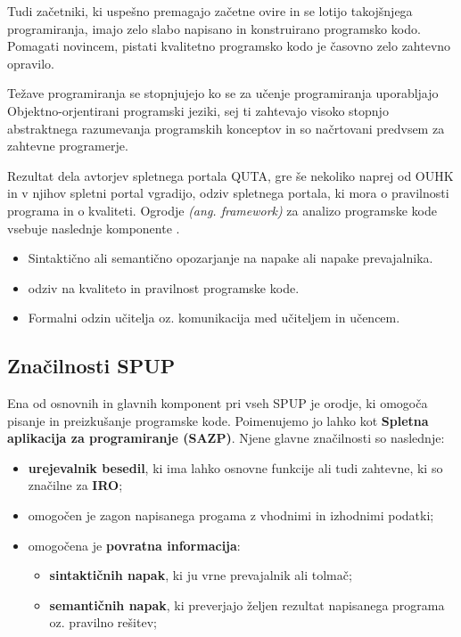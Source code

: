 Tudi začetniki, ki uspešno premagajo začetne ovire in se lotijo
takojšnjega programiranja, imajo zelo slabo napisano in konstruirano
programsko kodo. Pomagati novincem, pistati kvalitetno programsko kodo
je časovno zelo zahtevno opravilo.

Težave programiranja se stopnjujejo ko se za učenje programiranja
uporabljajo Objektno-orjentirani programski jeziki, sej ti zahtevajo
visoko stopnjo abstraktnega razumevanja programskih konceptov in so
načrtovani predvsem za zahtevne programerje.


Rezultat dela avtorjev spletnega portala QUTA, gre še nekoliko naprej
od OUHK in v njihov spletni portal vgradijo, odziv spletnega portala,
ki mora o pravilnosti programa in o kvaliteti. Ogrodje
\emph{(ang. framework)} za analizo programske kode vsebuje naslednje
komponente \cite{thesisAWebP}.

\begin{itemize}
\tightlist
\item
  Sintaktično ali semantično opozarjanje na napake ali napake
  prevajalnika.
\item
  odziv na kvaliteto in pravilnost programske kode.
\item
  Formalni odzin učitelja oz. komunikacija med učiteljem in učencem.
\end{itemize}

\subsection{Značilnosti SPUP}
\label{sec:značilnosti_spup}

Ena od osnovnih in glavnih komponent pri vseh SPUP je orodje, ki
omogoča pisanje in preizkušanje programske kode. Poimenujemo jo lahko
kot \textbf{Spletna aplikacija za programiranje (SAZP)}. Njene
glavne značilnosti so naslednje:

\begin{itemize}
  \item \textbf{urejevalnik besedil}, ki ima lahko osnovne funkcije ali tudi
  zahtevne, ki so značilne za \textbf{IRO};
\item omogočen je zagon napisanega progama z vhodnimi in izhodnimi
  podatki;
\item omogočena je \textbf{povratna informacija}:
  \begin{itemize}
    \tightlist
  \item \textbf{sintaktičnih napak}, ki ju vrne prevajalnik ali tolmač;
  \item \textbf{semantičnih napak}, ki preverjajo željen rezultat napisanega
    programa oz. pravilno rešitev;
  \end{itemize}
\end{itemize}

